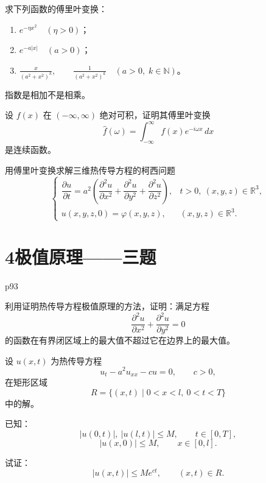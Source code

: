 \begin{homework}[1]
求下列函数的傅里叶变换：
\begin{enumerate}[(1)]
  \item $e^{-\eta x^2}\quad(\eta>0)$；
  \item $e^{-a|x|}\quad(a>0)$；
  \item $\displaystyle\frac{x}{(a^2+x^2)^k},\qquad
        \frac1{(a^2+x^2)^k}\quad(a>0,\;k\in\mathbb N)$。
\end{enumerate}
\end{homework}
\begin{dxtips}
    指数是相加不是相乘。
\end{dxtips}
\begin{homework}[2]
设 $f(x)$ 在 $(-\infty,\infty)$ 绝对可积，证明其傅里叶变换
\[
\hat f(\omega)=\int_{-\infty}^{\infty}f(x)e^{-i\omega x}\,dx
\]
是连续函数。
\end{homework}



\begin{homework}[3]
用傅里叶变换求解三维热传导方程的柯西问题
\[
\begin{cases}
\dfrac{\partial u}{\partial t}
=a^2\left(
\dfrac{\partial^2 u}{\partial x^2}
+\dfrac{\partial^2 u}{\partial y^2}
+\dfrac{\partial^2 u}{\partial z^2}
\right),
& t>0,\ (x,y,z)\in\mathbb R^3,\\[6pt]
u(x,y,z,0)=\varphi(x,y,z),
& (x,y,z)\in\mathbb R^3.
\end{cases}
\]
\end{homework}

\section{4极值原理——三题}
p93
\begin{homework}[2]
利用证明热传导方程极值原理的方法，证明：满足方程
\[
\frac{\partial^2 u}{\partial x^2}+\frac{\partial^2 u}{\partial y^2}=0
\]
的函数在有界闭区域上的最大值不超过它在边界上的最大值。
\end{homework}





\begin{homework}[3]
设 $u(x,t)$ 为热传导方程
\[
u_t - a^2 u_{xx} - c u = 0,\qquad c>0,
\]
在矩形区域
\[
R=\{(x,t)\mid 0 < x < l,\ 0<t<T\}
\]
中的解。

已知：
\[
|u(0,t)|,\ |u(l,t)| \le M,\qquad t\in[0,T],
\]
\[
|u(x,0)|\le M,\qquad x\in[0,l].
\]

试证：
\[
|u(x,t)|\le M e^{ct},\qquad (x,t)\in R.
\]
\end{homework}



